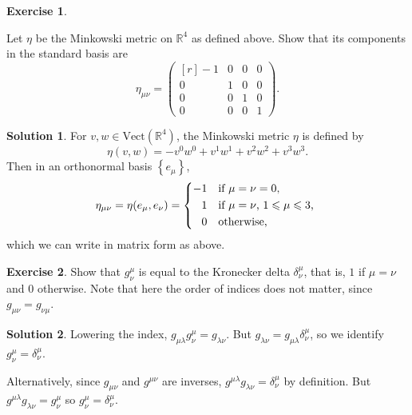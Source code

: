 \documentclass[11pt, a4paper]{report}
\theoremstyle{definition}
\newtheorem{ex}{Exercise}[part]
\newtheorem{sol}{Solution}[part]
\renewcommand{\leq}{\leqslant}
\begin{document}
\begin{ex}\label{ex:minkowskimetric}

Let $\eta$ be the Minkowski metric on $\mathbb{R}^4$ as defined above.
Show that its components in the standard basis are
\[
    \eta_{\mu\nu} = \begin{pmatrix*}[r]
            -1 & 0 & 0 & 0 \\
            0 & 1 & 0 & 0 \\
            0 & 0 & 1 & 0 \\
            0 & 0 & 0 & 1
        \end{pmatrix*}.
\]

\end{ex}

\begin{sol}

For $v, w \in \text{Vect}(\mathbb{R}^4)$, the Minkowski metric $\eta$ is defined by
\[
    \eta(v, w) = -v^0 w^0 + v^1 w^1 + v^2 w^2 + v^3 w^3.
\]
Then in an orthonormal basis $\left\{e_\mu\right\}$,
\[
    \eta_{\mu\nu} = \eta(e_\mu, e_\nu) = \begin{dcases*}
            -1            & if $\mu = \nu = 0$, \\ %
            \phantom{-} 1 & if $\mu = \nu$, $1 \leq \mu \leq 3$, \\ %
            \phantom{-} 0 & otherwise,
        \end{dcases*}
\]
which we can write in matrix form as above.

\end{sol}

\begin{ex}

Show that $g^\mu_\nu$ is equal to the Kronecker delta $\delta^\mu_\nu$, that is, $1$ if $\mu = \nu$ and $0$ otherwise. Note that here the order of indices does not matter, since $g_{\mu\nu} = g_{\nu\mu}$.

\end{ex}

\begin{sol}

Lowering the index, $g_{\mu\lambda}g^\mu_\nu = g_{\lambda\nu}$.
But $g_{\lambda\nu} = g_{\mu\lambda}\delta^\mu_\nu$, so we identify $g^\mu_\nu = \delta^\mu_\nu$.

Alternatively, since $g_{\mu\nu}$ and $g^{\mu\nu}$ are inverses, $g^{\mu\lambda} g_{\lambda\nu} = \delta^\mu_\nu$ by definition.
But $g^{\mu\lambda} g_{\lambda\nu} = g^\mu_\nu$ so $g^\mu_\nu = \delta^\mu_\nu$.

\end{sol}
\end{document}
